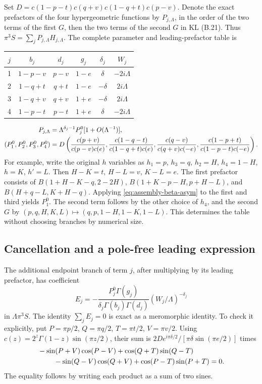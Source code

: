 Set $D=c(1-p-t)c(q+v)c(1-q+t)c(p-v)$. Denote the exact prefactors of
the four hypergeometric functions by $P_{j,\Lambda}$, in the order
of the two terms of the first $G$, then the two terms of the second $G$
in KL (B.21). Thus $\pi^3S=\sum_jP_{j,\Lambda}H_{j,\Lambda}$.
The complete parameter and leading-prefactor table is
\begin{center}
\small
\begin{tabular}{c c c c c c}
\toprule
$j$ & $b_j$ & $d_j$ & $g_j$ & $\delta_j$ & $W_j$\\
\midrule
1 & $1-p-v$ & $p-v$ & $1-e$ & $\delta$ & $-2i\Lambda$\\
2 & $1-q+t$ & $q+t$ & $1-e$ & $-\delta$ & $2i\Lambda$\\
3 & $1-q+v$ & $q+v$ & $1+e$ & $-\delta$ & $2i\Lambda$\\
4 & $1-p-t$ & $p-t$ & $1+e$ & $\delta$ & $-2i\Lambda$\\
\bottomrule
\end{tabular}
\end{center}
\begin{align}
 P_{j,\Lambda}&=\Lambda^{\delta_j-1}P_j^0[1+O(\Lambda^{-1})],\notag\\
 (P_1^0,P_2^0,P_3^0,P_4^0)
 &=D\left(\frac{c(p+v)}{c(p-v)c(e)},
 \frac{c(1-q-t)}{c(1-q+t)c(e)},
 \frac{c(q-v)}{c(q+v)c(-e)},
 \frac{c(1-p+t)}{c(1-p-t)c(-e)}\right).
 \label{eq:assembly-prefactors}
\end{align}
For example, write the original $h$ variables as
$h_1=p$, $h_3=q$, $h_2=H$, $h_4=1-H$, $h=K$, $h'=L$.
Then $H-K=t$, $H-L=v$, $K-L=e$. The first prefactor consists of
$B(1+H-K-q,2-2H)$, $B(1+K-p-H,p+H-L)$,
and $B(H+q-L,K+H-q)$. Applying \eqref{eq:assembly-beta-asym}
to the first and third yields $P_1^0$. The second term follows by
the other choice of $h_4$, and the second $G$ by
$(p,q,H,K,L)\mapsto(q,p,1-H,1-K,1-L)$.
This determines the table without choosing branches by numerical size.

\subsection{Cancellation and a pole-free leading expression}
The additional endpoint branch of term $j$, after multiplying by its
leading prefactor, has coefficient
\begin{equation}
 E_j=-\frac{P_j^0\Gamma(g_j)}
 {\delta_j\Gamma(b_j)\Gamma(d_j)}
 (W_j/\Lambda)^{-\delta_j}
 \label{eq:assembly-extra}
\end{equation}
in $\Lambda\pi^3S$. The identity $\sum_jE_j=0$ is exact as a meromorphic
identity. To check it explicitly, put
$P=\pi p/2$, $Q=\pi q/2$, $T=\pi t/2$, $V=\pi v/2$.
Using $c(z)=2^z\Gamma(1-z)\sin(\pi z/2)$, their sum is
$2D e^{i\pi\delta/2}/[\pi\delta\sin(\pi e/2)]$ times
\begin{align}
 &-\sin(P+V)\cos(P-V)+\cos(Q+T)\sin(Q-T)\notag\\
 &\hspace{8mm}-\sin(Q-V)\cos(Q+V)+\cos(P-T)\sin(P+T)=0.
 \label{eq:assembly-trig-zero}
\end{align}
The equality follows by writing each product as a sum of two sines.


